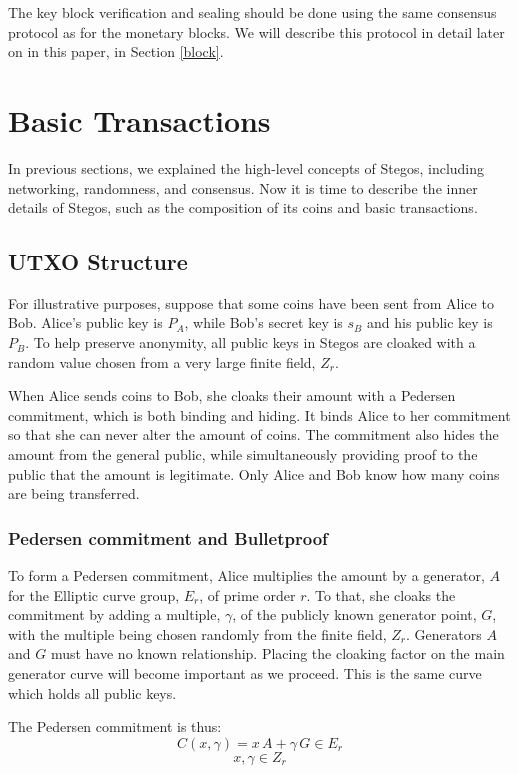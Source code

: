 \documentclass[a4paper, 10pt, conference]{ieeeconf}
\begin{document}
The key block verification and sealing should be done using the same consensus protocol as for the monetary blocks. We will describe this protocol in detail later on in this paper, in Section \ref{block}.

\section{Basic Transactions}\label{TransactionsAppendix}

In previous sections, we explained the high-level concepts of Stegos, including networking, randomness, and consensus. Now it is time to describe the inner details of Stegos, such as the composition of its coins and basic transactions.

\subsection{UTXO Structure}\label{UTXO}

For illustrative purposes, suppose that some coins have been sent from Alice to Bob. Alice's public key is $P_A$, while Bob's secret key is $s_B$ and his public key is $P_B$. To help preserve anonymity, all public keys in Stegos are cloaked with a random value chosen from a very large finite field, $Z_r$.

When Alice sends coins to Bob, she cloaks their amount with a Pedersen commitment, which is both binding and hiding. It binds Alice to her commitment so that she can never alter the amount of coins. The commitment also hides the amount from the general public, while simultaneously providing proof to the public that the amount is legitimate. Only Alice and Bob know how many coins are being transferred. 

\subsubsection{Pedersen commitment and Bulletproof} To form a Pedersen commitment, Alice multiplies the amount by a generator, $A$ for the Elliptic curve group, $E_r$, of prime order $r$. To that, she cloaks the commitment by adding a multiple, $\gamma$, of the publicly known generator point, $G$, with the multiple being chosen randomly from the finite field, $Z_r$. Generators $A$ and $G$ must have no known relationship. Placing the cloaking factor on the main generator curve will become important as we proceed. This is the same curve which holds all public keys. 

The Pedersen commitment is thus:
$$ C(x, \gamma) = x \, A + \gamma \, G \in E_r$$
$$x, \gamma \in Z_r$$
\end{document}
